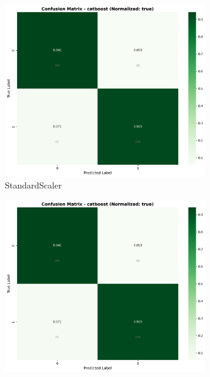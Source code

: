 \begin{figure}[H]
\centering
\begin{subfigure}[b]{0.31\textwidth}
\centering
\includegraphics[width=0.95\textwidth]{Result/cleveland_dataset/confusion_matrices/catboost_numeric_dataset_StandardScaler.png}
\caption{StandardScaler}
\label{fig:cat_clev_cm_standard}
\end{subfigure}\hfill
\begin{subfigure}[b]{0.31\textwidth}
\centering
\includegraphics[width=0.95\textwidth]{Result/cleveland_dataset/confusion_matrices/catboost_numeric_dataset_MinMaxScaler.png}

\end{subfigure}
\end{figure}
